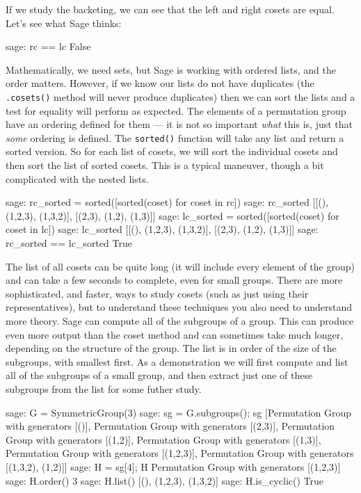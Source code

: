 %
If we study the backeting, we can see that the left and right cosets are equal.  Let's see what Sage thinks:
%
\begin{sageexample}
sage: rc == lc
False
\end{sageexample}
%
Mathematically, we need sets, but Sage is working with ordered lists, and the order matters.  However, if we know our lists do not have duplicates (the \verb?.cosets()? method will never produce duplicates) then we can sort the lists and a test for equality will perform as expected.  The elements of a permutation group have an ordering defined for them --- it is not so important \emph{what} this is, just that \emph{some} ordering is defined.  The \verb?sorted()? function will take any list and return a sorted version.  So for each list of cosets, we will sort the individual cosets and then sort the list of sorted cosets.  This is a typical maneuver, though a bit complicated with the nested lists.
%
\begin{sageexample}
sage: rc_sorted = sorted([sorted(coset) for coset in rc])
sage: rc_sorted
[[(), (1,2,3), (1,3,2)], [(2,3), (1,2), (1,3)]]
sage: lc_sorted = sorted([sorted(coset) for coset in lc])
sage: lc_sorted
[[(), (1,2,3), (1,3,2)], [(2,3), (1,2), (1,3)]]
sage: rc_sorted == lc_sorted
True
\end{sageexample}
%
The list of all cosets can be quite long (it will include every element of the group) and can take a few seconds to complete, even for small groups.  There are more sophisticated, and faster, ways to study cosets (such as just using their representatives), but to understand these techniques you also need to understand more theory.
%
%
Sage can compute all of the subgroups of a group.  This can produce even more output than the coset method and can sometimes take much longer, depending on the structure of the group.  The list is in order of the size of the subgroups, with smallest first.  As a demonstration we will first compute and list all of the subgroups of a small group, and then extract just one of these subgroups from the list for some futher study.
%
\begin{sageexample}
sage: G = SymmetricGroup(3)
sage: sg = G.subgroups(); sg
[Permutation Group with generators [()],
 Permutation Group with generators [(2,3)],
 Permutation Group with generators [(1,2)],
 Permutation Group with generators [(1,3)],
 Permutation Group with generators [(1,2,3)],
 Permutation Group with generators [(1,3,2), (1,2)]]
sage: H = sg[4]; H
Permutation Group with generators [(1,2,3)]
sage: H.order()
3
sage: H.list()
[(), (1,2,3), (1,3,2)]
sage: H.is_cyclic()
True
\end{sageexample}
